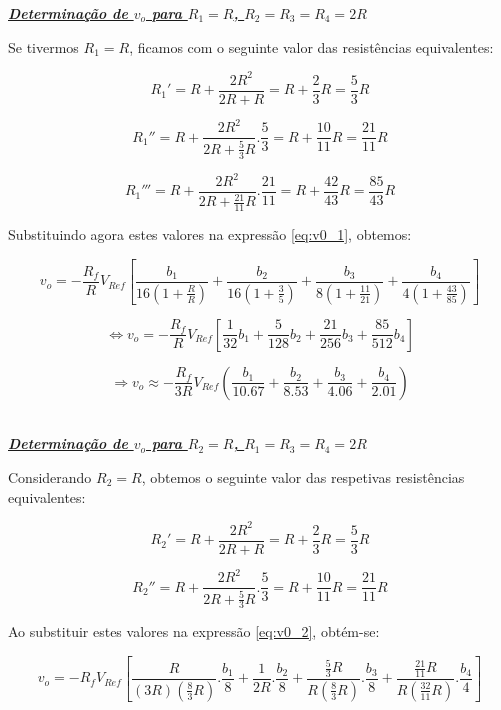 \documentclass[a4paper,11pt]{report}
\begin{document}
\par

\large\underline{\textit{\textbf{Determinação de $v_o$ para $R_1=R$, $R_2=R_3=R_4=2R$}}}\\
\par

Se tivermos $R_1=R$, ficamos com o seguinte valor das resistências equivalentes:

$$R_1'=R+\frac{2R^2}{2R+R}=R+\frac{2}{3}R=\frac{5}{3}R$$

$$R_1''=R+\frac{2R^2}{2R+\frac{5}{3}R}.\frac{5}{3}=R+\frac{10}{11}R=\frac{21}{11}R$$

$$R_1'''=R+\frac{2R^2}{2R+\frac{21}{11}R}.\frac{21}{11}=R+\frac{42}{43}R=\frac{85}{43}R$$

Substituindo agora estes valores na expressão \ref{eq:v0_1}, obtemos:

$$v_o=-\frac{R_f}{R}V_{Ref}\left[\frac{b_1}{16\left(1+\frac{R}{R}\right)}+\frac{b_2}{16\left(1+\frac{3}{5}\right)}+\frac{b_3}{8\left(1+\frac{11}{21}\right)}+\frac{b_4}{4\left(1+\frac{43}{85}\right)}\right]$$

$$\Leftrightarrow v_o=-\frac{R_f}{R}V_{Ref}\left[\frac{1}{32}b_1+\frac{5}{128}b_2+\frac{21}{256}b_3+\frac{85}{512}b_4\right]$$

\begin{equation}\label{eq:v0_1R}
\Rightarrow v_o\approx -\frac{R_f}{3R}V_{Ref}\left(\frac{b_1}{10.67}+\frac{b_2}{8.53}+\frac{b_3}{4.06}+\frac{b_4}{2.01}\right)
\end{equation}\\

\par

\large\underline{\textit{\textbf{Determinação de $v_o$ para $R_2=R$, $R_1=R_3=R_4=2R$}}}\\
\par

Considerando $R_2=R$, obtemos o seguinte valor das respetivas resistências equivalentes:

$$R_2'=R+\frac{2R^2}{2R+R}=R+\frac{2}{3}R=\frac{5}{3}R$$

$$R_2''=R+\frac{2R^2}{2R+\frac{5}{3}R}.\frac{5}{3}=R+\frac{10}{11}R=\frac{21}{11}R$$

Ao substituir estes valores na expressão \ref{eq:v0_2}, obtém-se:

$$v_o=-R_fV_{Ref}\left[\frac{R}{\left(3R\right)\left(\frac{8}{3}R\right)}.\frac{b_1}{8}+\frac{1}{2R}.\frac{b_2}{8}+\frac{\frac{5}{3}R}{R\left(\frac{8}{3}R\right)}.\frac{b_3}{8}+\frac{\frac{21}{11}R}{R\left(\frac{32}{11}R\right)}.\frac{b_4}{4}\right]$$
\end{document}
